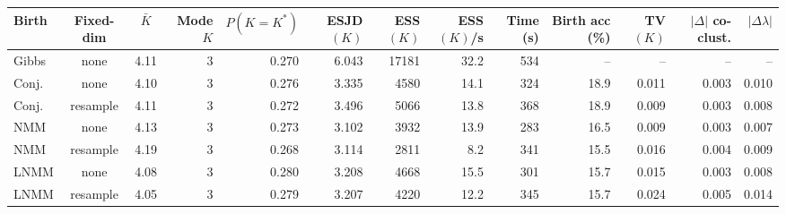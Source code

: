 
\begin{tabular}{l c c r r r r r r r r r r}
  \toprule
  Birth & Fixed-dim & $\bar{K}$ & Mode $K$ & $P(K{=}K^*)$ & ESJD$(K)$ & ESS$(K)$ & ESS$(K)$/s & Time (s) & Birth acc (\%) & TV$(K)$ & $|\Delta|$ co-clust. & $|\Delta \lambda|$ \\
  \midrule
  Gibbs & none & 4.11 & 3 & 0.270 & 6.043 & 17181 & 32.2 & 534 & -- & -- & -- & -- \\
  \midrule
  Conj. & none & 4.10 & 3 & 0.276 & 3.335 & 4580 & 14.1 & 324 & 18.9 & 0.011 & 0.003 & 0.010 \\
  Conj. & resample & 4.11 & 3 & 0.272 & 3.496 & 5066 & 13.8 & 368 & 18.9 & 0.009 & 0.003 & 0.008 \\
  \midrule
  NMM & none & 4.13 & 3 & 0.273 & 3.102 & 3932 & 13.9 & 283 & 16.5 & 0.009 & 0.003 & 0.007 \\
  NMM & resample & 4.19 & 3 & 0.268 & 3.114 & 2811 & 8.2 & 341 & 15.5 & 0.016 & 0.004 & 0.009 \\
  \midrule
  LNMM & none & 4.08 & 3 & 0.280 & 3.208 & 4668 & 15.5 & 301 & 15.7 & 0.015 & 0.003 & 0.008 \\
  LNMM & resample & 4.05 & 3 & 0.279 & 3.207 & 4220 & 12.2 & 345 & 15.7 & 0.024 & 0.005 & 0.014 \\
  \bottomrule
\end{tabular}
